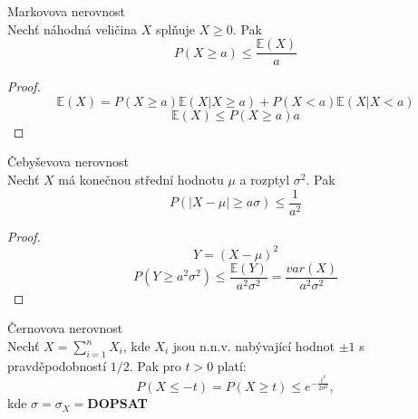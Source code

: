 \documentclass[../main.tex]{subfiles}
\begin{document}
\begin{theorem}
    Markovova nerovnost\\

    Nechť náhodná veličina $X$ splňuje $X\geq 0$. Pak
    \[P(X\geq a) \leq \frac{\mathbb{E}(X)}{a}\]
    \begin{proof}
        \[\mathbb{E}(X) = P(X\geq a)\mathbb{E}(X|X\geq a) + P(X< a) \mathbb{E}(X|X<a)\]
        \[ \mathbb{E}(X) \leq P(X\geq a)a\]
    \end{proof}
\end{theorem}
\begin{theorem}
    Čebyševova nerovnost\\

    Nechť $X$ má konečnou střední hodnotu $\mu$ a rozptyl $\sigma^2$. Pak
    \[P(|X-\mu|\geq a\sigma)\leq \frac{1}{a^2}\]
    \begin{proof}
        \[Y = (X-\mu)^2\]
        \[P(Y\geq a^2\sigma^2) \leq \frac{\mathbb{E}(Y)}{a^2\sigma^2}= \frac{var(X)}{a^2\sigma^2}\]
    \end{proof}
\end{theorem} 
\begin{theorem}
    Černovova nerovnost\\

    Nechť $X = \sum^n_{i=1} X_i$, kde $X_i$ jsou n.n.v. nabývající hodnot $\pm 1$ s pravděpodobností $1/2$. Pak pro $t>0$ platí:
    \[P(X\leq -t) = P(X\geq t) \leq e^{-\frac{t^2}{2\sigma^2}},\]
    kde $\sigma = \sigma_X = $\textbf{DOPSAT} 
\end{theorem}
\end{document}
